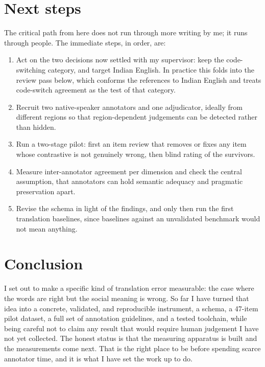 \documentclass[11pt]{article}
\begin{document}
\section{Next steps}

The critical path from here does not run through more writing by me; it runs
through people. The immediate steps, in order, are:

\begin{enumerate}
  \item Act on the two decisions now settled with my supervisor: keep the
  code-switching category, and target Indian English. In practice this folds into
  the review pass below, which conforms the references to Indian English and treats
  code-switch agreement as the test of that category.
  \item Recruit two native-speaker annotators and one adjudicator, ideally from
  different regions so that region-dependent judgements can be detected rather than
  hidden.
  \item Run a two-stage pilot: first an item review that removes or fixes any item
  whose contrastive is not genuinely wrong, then blind rating of the survivors.
  \item Measure inter-annotator agreement per dimension and check the central
  assumption, that annotators can hold semantic adequacy and pragmatic preservation
  apart.
  \item Revise the schema in light of the findings, and only then run the first
  translation baselines, since baselines against an unvalidated benchmark would not
  mean anything.
\end{enumerate}

\section{Conclusion}

I set out to make a specific kind of translation error measurable: the case where
the words are right but the social meaning is wrong. So far I have turned that idea
into a concrete, validated, and reproducible instrument, a schema, a 47-item pilot
dataset, a full set of annotation guidelines, and a tested toolchain, while being
careful not to claim any result that would require human judgement I have not yet
collected. The honest status is that the measuring apparatus is built and the
measurements come next. That is the right place to be before spending scarce
annotator time, and it is what I have set the work up to do.
\end{document}

